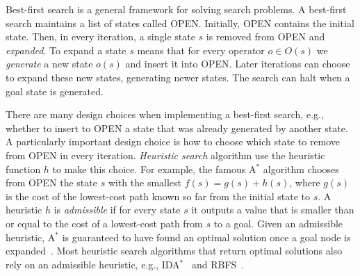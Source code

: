 \documentclass{article}
\newcommand{\open}{\textsc{OPEN}\xspace}
\newcommand{\astar}{A$^*$\xspace}
\newcommand{\ida}{IDA$^*$\xspace}
\begin{document}




Best-first search is a general framework for solving search problems. 
A best-first search maintains a list of states called \open. Initially, \open contains the initial state. Then, in every iteration, a single state $s$ is removed from \open and \emph{expanded}. 
To expand a state $s$ means that for every operator $o\in O(s)$ 
we \emph{generate} a new state $o(s)$ and insert it into \open. 
Later iterations can choose to expand these new states, generating newer states. The search can halt when a goal state is generated. 


There are many design choices when implementing a best-first search, e.g., whether to insert to \open a state that was already generated by another state. A particularly important design choice is how to choose which state to remove from \open in every iteration. \emph{Heuristic search} algorithm use the heuristic function $h$ to make this choice. For example, the famous \astar algorithm chooses from \open the state $s$ with the smallest $f(s)=g(s)+h(s)$, where $g(s)$ is the cost of the lowest-cost path known so far from the initial state to $s$. 
A heuristic $h$ is \emph{admissible} if for every state $s$ it outputs a value that is smaller than or equal to the cost of a lowest-cost path from $s$ to a goal. 
Given an admissible heuristic, \astar is guaranteed to have found an optimal solution once a goal node is expanded~\cite{hartNR68Astar}. Most heuristic search algorithms that return optimal solutions also rely on an admissible heuristic, e.g., \ida~\cite{korf1985depth} and RBFS~\cite{Korf1992LinearSpaceBestFirstSearch}. %
\end{document}
